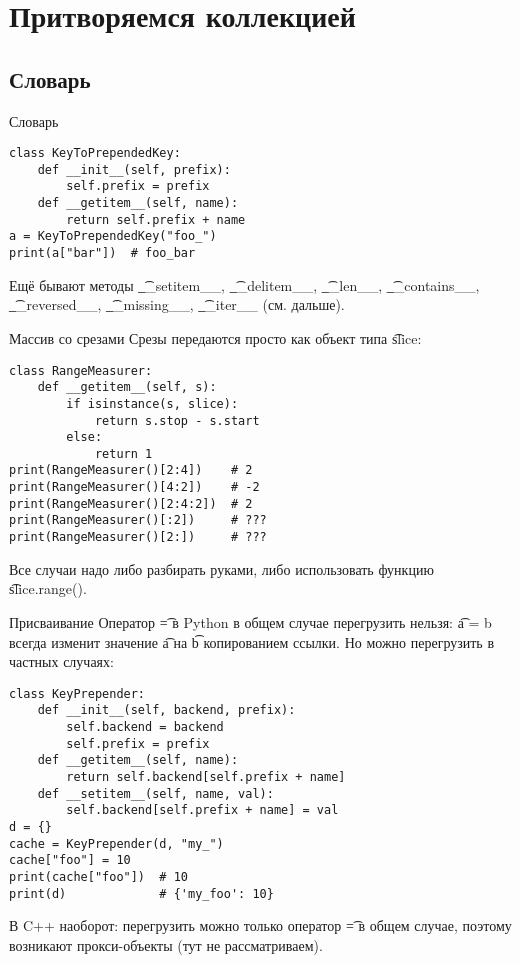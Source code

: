 \section{Притворяемся коллекцией}
\subsection{Словарь}
\begin{frame}
\end{frame}

\begin{frame}[fragile]{Словарь}
\begin{verbatim}
class KeyToPrependedKey:
    def __init__(self, prefix):
        self.prefix = prefix
    def __getitem__(self, name):
        return self.prefix + name
a = KeyToPrependedKey("foo_")
print(a["bar"])  # foo_bar
\end{verbatim}
	Ещё бывают методы \t{\_\_setitem\_\_}, \t{\_\_delitem\_\_}, \t{\_\_len\_\_}, \t{\_\_contains\_\_}, \t{\_\_reversed\_\_}, \t{\_\_missing\_\_}, \t{\_\_iter\_\_} (см. дальше).
\end{frame}

\begin{frame}[fragile]{Массив со срезами}
	Срезы передаются просто как объект типа \t{slice}:
\begin{verbatim}
class RangeMeasurer:
    def __getitem__(self, s):
        if isinstance(s, slice):
            return s.stop - s.start
        else:
            return 1
print(RangeMeasurer()[2:4])    # 2
print(RangeMeasurer()[4:2])    # -2
print(RangeMeasurer()[2:4:2])  # 2
print(RangeMeasurer()[:2])     # ???
print(RangeMeasurer()[2:])     # ???
\end{verbatim}
	\pause
	Все случаи надо либо разбирать руками, либо использовать функцию \t{slice.range()}.
\end{frame}

\begin{frame}[fragile]{Присваивание}
	Оператор \t{=} в Python в общем случае перегрузить нельзя: \t{a = b}
	всегда изменит значение \t{a} на \t{b} копированием ссылки.
	Но можно перегрузить в частных случаях:
\begin{verbatim}
class KeyPrepender:
    def __init__(self, backend, prefix):
        self.backend = backend
        self.prefix = prefix
    def __getitem__(self, name):
        return self.backend[self.prefix + name]
    def __setitem__(self, name, val):
        self.backend[self.prefix + name] = val
d = {}
cache = KeyPrepender(d, "my_")
cache["foo"] = 10
print(cache["foo"])  # 10
print(d)             # {'my_foo': 10}
\end{verbatim}

	В C++ наоборот: перегрузить можно только оператор \t{=} в общем случае,
	поэтому возникают прокси-объекты (тут не рассматриваем).
\end{frame}

